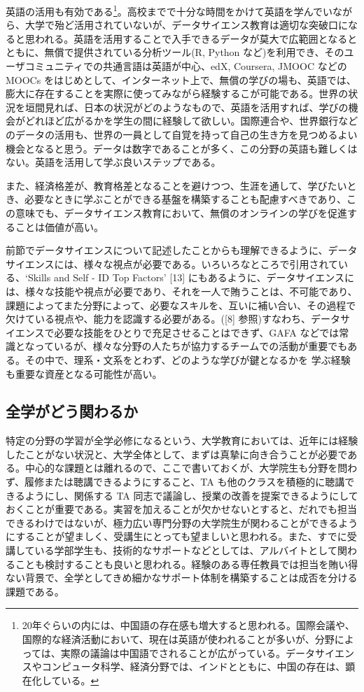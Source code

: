 \documentclass[
]{book}
\theoremstyle{definition}
\theoremstyle{definition}
\theoremstyle{definition}
\theoremstyle{definition}
\theoremstyle{remark}
\begin{document}
英語の活用も有効である\footnote{20年ぐらいの内には、中国語の存在感も増大すると思われる。国際会議や、国際的な経済活動において、現在は英語が使われることが多いが、分野によっては、実際の議論は中国語でされることが広がっている。データサイエンスやコンピュータ科学、経済分野では、インドとともに、中国の存在は、顕在化している。}。高校までで十分な時間をかけて英語を学んでいながら、大学で殆ど活用されていないが、データサイエンス教育は適切な突破口になると思われる。英語を活用することで入手できるデータが莫大で広範囲となるとともに、無償で提供されている分析ツール(R, Python など)を利用でき、そのユーザコミュニティでの共通言語は英語が中心、edX, Coursera, JMOOC などの MOOCs をはじめとして、インターネット上で、無償の学びの場も、英語では、膨大に存在することを実際に使ってみながら経験するこが可能である。世界の状況を垣間見れば、日本の状況がどのようなもので、英語を活用すれば、学びの機会がどれほど広がるかを学生の間に経験して欲しい。国際連合や、世界銀行などのデータの活用も、世界の一員として自覚を持って自己の生き方を見つめるよい機会となると思う。データは数字であることが多く、この分野の英語も難しくはない。英語を活用して学ぶ良いステップである。

また、経済格差が、教育格差となることを避けつつ、生涯を通して、学びたいとき、必要なときに学ぶことができる基盤を構築することも配慮すべきであり、この意味でも、データサイエンス教育において、無償のオンラインの学びを促進することは価値が高い。

前節でデータサイエンスについて記述したことからも理解できるように、データサイエンスには、様々な視点が必要である。いろいろなところで引用されている、`Skills and Self - ID Top Factors' {[}13{]} にもあるように、データサイエンスには、様々な技能や視点が必要であり、それを一人で賄うことは、不可能であり、課題によってまた分野によって、必要なスキルを、互いに補い合い、その過程で欠けている視点や、能力を認識する必要がある。({[}8{]} 参照)すなわち、データサイエンスで必要な技能をひとりで充足させることはできず、GAFA などでは常識となっているが、様々な分野の人たちが協力するチームでの活動が重要でもある。その中で、理系・文系をとわず、どのような学びが鍵となるかを 学ぶ経験も重要な資産となる可能性が高い。

\hypertarget{ux5168ux5b66ux304cux3069ux3046ux95a2ux308fux308bux304b}{%
\subsection{全学がどう関わるか}\label{ux5168ux5b66ux304cux3069ux3046ux95a2ux308fux308bux304b}}

特定の分野の学習が全学必修になるという、大学教育においては、近年には経験したことがない状況と、大学全体として、まずは真摯に向き合うことが必要である。中心的な課題とは離れるので、ここで書いておくが、大学院生も分野を問わず、履修または聴講できるようにすること、TA も他のクラスを積極的に聴講できるようにし、関係する TA 同志で議論し、授業の改善を提案できるようにしておくことが重要である。実習を加えることが欠かせないとすると、だれでも担当できるわけではないが、極力広い専門分野の大学院生が関わることができるようにすることが望ましく、受講生にとっても望ましいと思われる。また、すでに受講している学部学生も、技術的なサポートなどとしては、アルバイトとして関わることも検討することも良いと思われる。経験のある専任教員では担当を賄い得ない背景で、全学としてきめ細かなサポート体制を構築することは成否を分ける課題である。
\end{document}
